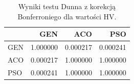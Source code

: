 \begin{table}
\caption{Wyniki testu Dunna z korekcją Bonferroniego dla wartości HV.}
\label{tab:dunn_global}
\begin{tabular}{lrrr}
\toprule
 & GEN & ACO & PSO \\
\midrule
GEN & 1.000000 & 0.000217 & 0.000241 \\
ACO & 0.000217 & 1.000000 & 1.000000 \\
PSO & 0.000241 & 1.000000 & 1.000000 \\
\bottomrule
\end{tabular}
\end{table}
